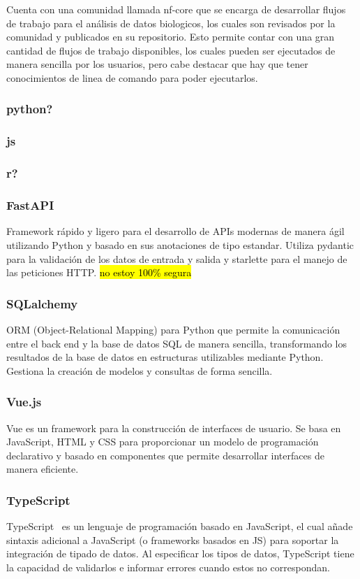 Cuenta con una comunidad llamada nf-core que se encarga de desarrollar flujos de trabajo para el análisis de datos biologicos, los cuales son revisados por la comunidad y publicados en su repositorio. Esto permite contar con una gran cantidad de flujos de trabajo disponibles, los cuales pueden ser ejecutados de manera sencilla por los usuarios, pero cabe destacar que hay que tener conocimientos de linea de comando para poder ejecutarlos.


\subsubsection{python?}
\subsubsection{js}

\subsubsection{r?}

\subsubsection{FastAPI}
Framework rápido  y ligero para el desarrollo de APIs modernas de manera ágil utilizando Python y basado en sus anotaciones de tipo estandar.
Utiliza pydantic para la validación de los datos de entrada y salida y starlette para el manejo de las peticiones HTTP. \hl{no estoy 100\% segura}
\subsubsection{SQLalchemy}
ORM (Object-Relational Mapping) para Python que permite la comunicación entre el back end y la base de datos SQL de manera sencilla, transformando los resultados de la base de datos en estructuras utilizables mediante Python. Gestiona la creación de modelos y consultas de forma sencilla.
\subsubsection{Vue.js}
Vue es un framework para la construcción de interfaces de usuario. Se basa en JavaScript, HTML y CSS para proporcionar un modelo de programación declarativo y basado en componentes que permite desarrollar interfaces de manera eficiente.
\subsubsection{TypeScript}
TypeScript~\cite{bierman2014understanding} es un lenguaje de programación basado en JavaScript, el cual añade sintaxis adicional a JavaScript (o frameworks basados en JS) para soportar la integración de tipado de datos. Al especificar los tipos de datos, TypeScript tiene la capacidad de validarlos e informar errores cuando estos no correspondan.
